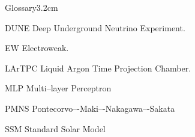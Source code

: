\begin{mclistof}{Glossary}{3.2cm}

\item[DUNE] Deep Underground Neutrino Experiment. 

\item[EW] Electroweak.

\item[LArTPC] Liquid Argon Time Projection Chamber. 

\item[MLP] Multi--layer Perceptron

\item[PMNS] Pontecorvo–-Maki–-Nakagawa–-Sakata

\item[SSM] Standard Solar Model

\end{mclistof} 
